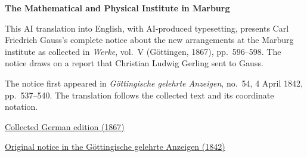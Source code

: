 \clearpage
\thispagestyle{empty}
\begin{center}\Large\textbf{The Mathematical and Physical Institute in Marburg}\end{center}

This AI translation into English, with AI-produced typesetting, presents Carl Friedrich Gauss’s complete notice about the new arrangements at the Marburg institute as collected in \textit{Werke}, vol.~V (Göttingen, 1867), pp.~596--598. The notice draws on a report that Christian Ludwig Gerling sent to Gauss.

The notice first appeared in \textit{Göttingische gelehrte Anzeigen}, no.~54, 4 April 1842, pp.~537--540. The translation follows the collected text and its coordinate notation.

\medskip\noindent
\href{https://gdz.sub.uni-goettingen.de/id/PPN236006339}{Collected German edition (1867)}\par
\noindent\href{https://gdz.sub.uni-goettingen.de/id/PPN385030444_1842_1}{Original notice in the Göttingische gelehrte Anzeigen (1842)}
\clearpage
